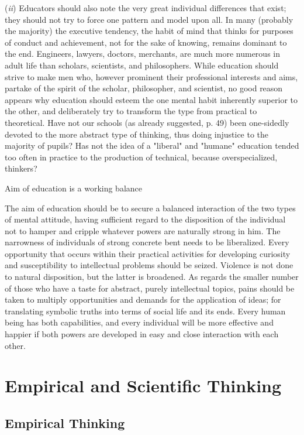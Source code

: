 \documentclass[letterpaper]{book}
\begin{document}
(\emph{ii}) Educators should also note the very great individual
differences that exist; they should not try to force one pattern and
model upon all. In many (probably the majority) the executive tendency,
the habit of mind that thinks for purposes of conduct and achievement,
not for the sake of knowing, remains dominant to the end. Engineers,
lawyers, doctors, merchants, are much more numerous in adult life than
scholars, scientists, and philosophers. While education should strive to
make men who, however prominent their professional interests and aims,
partake of the spirit of the scholar, philosopher, and scientist, no
good reason appears why education should esteem the one mental habit
inherently superior to the other, and deliberately try to transform the
type from practical to theoretical. Have not our schools (as already
suggested, p. 49) been one-sidedly devoted to the more abstract type of
thinking, thus doing injustice to the majority of pupils? Has not the
idea of a "liberal" and "humane" education tended too often in practice
to the production of technical, because overspecialized, thinkers?

Aim of education is a working balance

The aim of education should be to secure a balanced interaction of the
two types of mental attitude, having sufficient regard to the
disposition of the individual not to hamper and cripple whatever powers
are naturally strong in him. The narrowness of individuals of strong
concrete bent needs to be liberalized. Every
opportunity
that occurs within their practical activities for developing curiosity
and susceptibility to intellectual problems should be seized. Violence
is not done to natural disposition, but the latter is broadened. As
regards the smaller number of those who have a taste for abstract,
purely intellectual topics, pains should be taken to multiply
opportunities and demands for the application of ideas; for translating
symbolic truths into terms of social life and its ends. Every human
being has both capabilities, and every individual will be more effective
and happier if both powers are developed in easy and close interaction
with each
other.

\chapter{Empirical and Scientific Thinking}

\section{Empirical Thinking}
\end{document}
